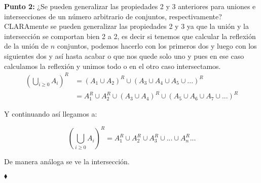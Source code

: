 \textbf{Punto 2: }¿Se pueden generalizar las propiedades 2 y 3 anteriores para uniones e intersecciones de un número arbitrario de conjuntos, respectivamente? \\

CLARAmente se pueden generalizar las propiedades 2 y 3 ya que la unión y la intersección se comportan bien 2 a 2, es decir si tenemos que calcular la reflexión de la unión de $n$ conjuntos, podemos hacerlo con los primeros dos y luego con los siguientes dos y así hasta acabar o que nos quede solo uno y pues en ese caso calculamos la reflexión y unimos todo o en el otro caso intersectamos.\\

\begin{align*}
\displaystyle\left(\bigcup_{i \geq 0} A_i\right)^R&=(A_1\cup A_2)^R\cup (A_3\cup A_4\cup A_5\cup ...)^R\\
&=A_1^R\cup A_2^R\cup (A_3\cup A_4)^R\cup (A_5\cup A_6\cup A_7\cup ...)^R
\end{align*}

Y continuando así llegamos a:

$$\displaystyle\left(\bigcup_{i \geq 0} A_i\right)^R=A_1^R\cup A_2^R\cup A_3^R\cup...\cup A_n^R...$$

De manera análoga se ve la intersección.

\hfill $\blacklozenge$


